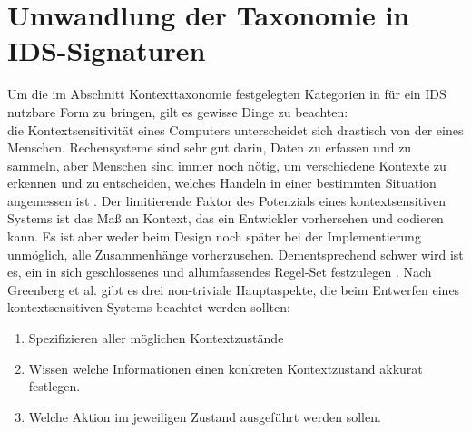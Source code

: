 \section{Umwandlung der Taxonomie in IDS-Signaturen} 
Um die im Abschnitt Kontexttaxonomie festgelegten Kategorien in für ein IDS nutzbare Form zu bringen, gilt es gewisse Dinge zu beachten:\\ die Kontextsensitivität eines Computers unterscheidet sich drastisch von der eines Menschen. Rechensysteme sind sehr gut darin, Daten zu erfassen und zu sammeln, aber Menschen sind immer noch nötig, um verschiedene Kontexte zu erkennen und zu entscheiden, welches Handeln in einer bestimmten Situation angemessen ist \cite{dey_understanding_2001}.
Der limitierende Faktor des Potenzials eines kontextsensitiven Systems ist das Maß an Kontext, das ein Entwickler vorhersehen und codieren kann.
Es ist aber weder beim Design noch später bei der Implementierung unmöglich, alle Zusammenhänge vorherzusehen. Dementsprechend schwer wird ist es, ein in sich geschlossenes und allumfassendes Regel-Set festzulegen \cite{perera_context_2014}.
Nach Greenberg et al. \cite{greenberg2001context} gibt es drei non-triviale Hauptaspekte, die beim Entwerfen eines kontextsensitiven Systems beachtet werden sollten:
\begin{enumerate}
\item{Spezifizieren aller möglichen Kontextzustände}
\item{Wissen welche Informationen einen konkreten Kontextzustand akkurat festlegen.}
\item{Welche Aktion im jeweiligen Zustand ausgeführt werden sollen.}
\end{enumerate}
